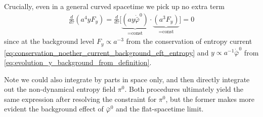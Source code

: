 Crucially, even in a general curved spacetime we pick up no extra term
{\small\begin{align}\label{eq:nontrivial_integ_by_part_time_curved}
    \tfrac{d}{d\tau}(a^4yF_y)=\tfrac{d}{d\tau}\Big[\underbrace{(ay\dot{\bar{\varphi}}^0)}_{=\text{const}}\cdot \underbrace{(a^3F_y)}_{=\text{const}}\Big]=0
\end{align}}
since at the background level $F_y\propto a^{-3}$ from the conservation of entropy current \eqref{eq:conservation_noether_current_background_eft_entropy} and $y\propto a^{-1}\dot{\bar{\varphi}}^0$ from \eqref{eq:evolution_y_background_from_definition}.

Note we could also integrate by parts in space only, and then directly integrate out the non-dynamical entropy field $\pi^0$.
Both procedures ultimately yield the same expression after resolving the constraint for $\pi^0$, but the former makes more evident the background effect of $\bar{\varphi}^0$ and the flat-spacetime limit.

